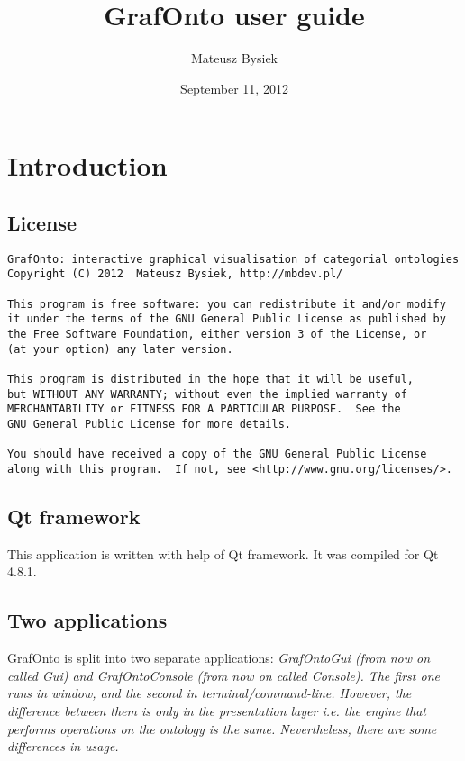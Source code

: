 \documentclass{article}
\begin{document}
\title{GrafOnto user guide}
\date{September 11, 2012}
\author{Mateusz Bysiek}
\maketitle

\tableofcontents


\pagebreak[4]


\section{Introduction}

\subsection{License}
\begin{verbatim}
GrafOnto: interactive graphical visualisation of categorial ontologies
Copyright (C) 2012  Mateusz Bysiek, http://mbdev.pl/

This program is free software: you can redistribute it and/or modify
it under the terms of the GNU General Public License as published by
the Free Software Foundation, either version 3 of the License, or
(at your option) any later version.

This program is distributed in the hope that it will be useful,
but WITHOUT ANY WARRANTY; without even the implied warranty of
MERCHANTABILITY or FITNESS FOR A PARTICULAR PURPOSE.  See the
GNU General Public License for more details.

You should have received a copy of the GNU General Public License
along with this program.  If not, see <http://www.gnu.org/licenses/>.
\end{verbatim}

\subsection{Qt framework}
This application is written with help of Qt framework. It was compiled for Qt 4.8.1. 

\subsection{Two applications}
GrafOnto is split into two separate applications: \em GrafOntoGui \em (from now on called \em Gui\em) and
\em GrafOntoConsole \em (from now on called \em Console\em).
The first one runs in window, and the second in terminal/command-line.
However, the difference between them is only in the presentation layer i.e. the engine that performs
operations on the ontology is the same. Nevertheless, there are some differences in usage.
\end{document}
